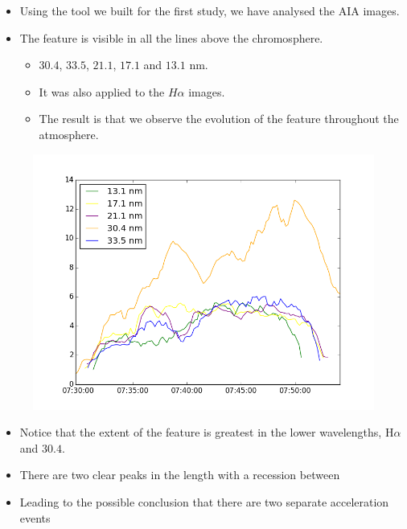 \documentclass{beamer}
\begin{document}
	\begin{frame}
		\begin{itemize}
			\item{Using the tool we built for the first study, we have analysed the AIA images.}
			\item{The feature is visible in all the lines above the chromosphere.}
			\begin{itemize}
				\item{$30.4$, $33.5$, $21.1$, $17.1$ and $13.1$ nm.}
				\item{It was also applied to the $H\alpha$ images.}
				\item{The result is that we observe the evolution of the feature throughout the atmosphere.}
			\end{itemize}
		\end{itemize}
			\begin{figure}
				\includegraphics[scale=0.32]{Figs/len_plot.png}
			\end{figure}

	\end{frame}
	
	\begin{frame}
		\begin{itemize}
			\item{Notice that the extent of the feature is greatest in the lower wavelengths, H$\alpha$ and $30.4$.}
		\end{itemize}
			\begin{itemize}
				\item{There are two clear peaks in the length with a recession between}
				\item{Leading to the possible conclusion that there are two separate acceleration events}
			\end{itemize}
	\end{frame}
	
\end{document}
